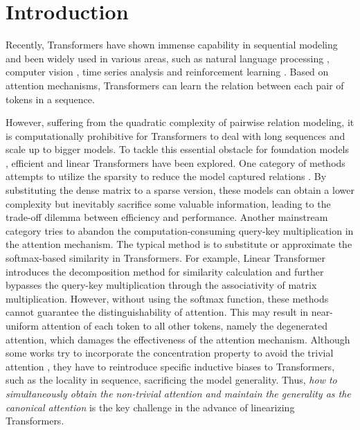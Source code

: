 \documentclass[nohyperref]{article}
\theoremstyle{plain}
\theoremstyle{definition}
\theoremstyle{remark}
\begin{document}
\section{Introduction}
\label{Introduction}

Recently, Transformers \citep{NIPS2017_3f5ee243} have shown immense capability in sequential modeling and been widely used in various areas, such as natural language processing \citep{Devlin2019BERTPO,liu2019roberta,NEURIPS2020_1457c0d6}, computer vision \citep{dosovitskiy2021an,liu2021Swin}, time series analysis \citep{haoyietal-informer-2021,wu2021autoformer} and reinforcement learning \citep{chen2021decisiontransformer,janner2021sequence}. Based on attention mechanisms, Transformers can learn the relation between each pair of tokens in a sequence. 

However, suffering from the quadratic complexity of pairwise relation modeling, it is computationally prohibitive for Transformers to deal with long sequences and scale up to bigger models. To tackle this essential obstacle for foundation models \citep{Bommasani2021OnTO}, efficient and linear Transformers have been explored. One category of methods attempts to utilize the sparsity to reduce the model captured relations \cite{Child2019GeneratingLS,Vyas2020FastTW,Zaheer2020BigBT}. By substituting the dense matrix to a sparse version, these models can obtain a lower complexity but inevitably sacrifice some valuable information, leading to the trade-off dilemma between efficiency and performance. Another mainstream category tries to abandon the computation-consuming query-key multiplication in the attention mechanism. The typical method is to substitute or approximate the softmax-based similarity in Transformers. For example, Linear Transformer \cite{Katharopoulos2020TransformersAR} introduces the decomposition method for similarity calculation and further bypasses the query-key multiplication through the associativity of matrix multiplication. However, without using the softmax function, these methods cannot guarantee the distinguishability of attention. This may result in near-uniform attention of each token to all other tokens, namely the degenerated attention, which damages the effectiveness of the attention mechanism. Although some works try to incorporate the concentration property to avoid the trivial attention \cite{Luo2021StableFA,anonymous2022cosformer}, they have to reintroduce specific inductive biases to Transformers, such as the locality in sequence, sacrificing the model generality. Thus, \emph{how to simultaneously obtain the non-trivial attention and maintain the generality as the canonical attention} is the key challenge in the advance of linearizing Transformers.
\end{document}
